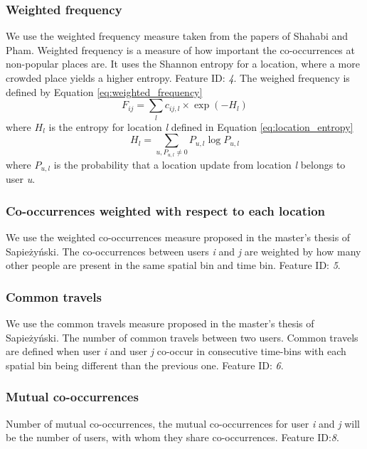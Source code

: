 \subsubsection{Weighted frequency}
We use the weighted frequency measure taken from the papers of Shahabi and Pham\cite{iRWRfSD}\cite{AEBMtISSfSD}.
Weighted frequency is a measure of how important the co-occurrences at non-popular places are.
It uses the Shannon entropy for a location, where a more crowded place yields a higher entropy.
Feature ID: \textit{4}.
The weighed frequency is defined by Equation \ref{eq:weighted_frequency}
\begin{equation}
\label{eq:weighted_frequency}
F_{ij}=\sum\limits_{l}c_{ij,l} \times \exp(-H_l)
\end{equation}
where $H_l$ is the entropy for location \textit{l} defined in Equation \ref{eq:location_entropy}
\begin{equation}
\label{eq:location_entropy}
H_l = \sum\limits_{u, P_{u,l}\neq0} P_{u,l}\log P_{u,l}
\end{equation}
where $P_{u,l}$ is the probability that a location update from location \textit{l} belongs to user \textit{u}.

\subsubsection{Co-occurrences weighted with respect to each location}
We use the weighted co-occurrences measure proposed in the master's thesis of Sapieżyński\cite{IMM2013-06556}.
The co-occurrences between users \textit{i} and \textit{j} are weighted by how many other people are present in the same spatial bin and time bin.
Feature ID: \textit{5}.

\subsubsection{Common travels}
We use the common travels measure proposed in the master's thesis of Sapieżyński\cite{IMM2013-06556}.
The number of common travels between two users. Common travels are defined when user \textit{i} and user \textit{j} co-occur in consecutive time-bins with each spatial bin being different than the previous one. Feature ID: \textit{6}.

\subsubsection{Mutual co-occurrences}
Number of mutual co-occurrences, the mutual co-occurrences for user \textit{i} and \textit{j} will be the number of users, with whom they share co-occurrences. Feature ID:\textit{8}.

